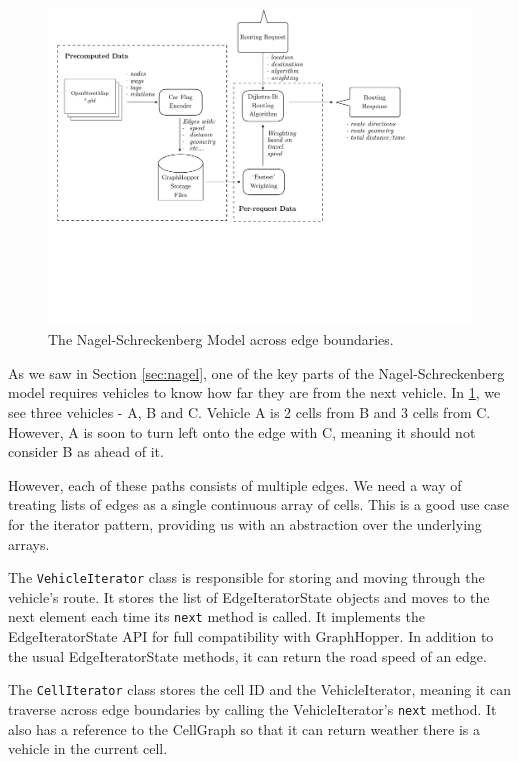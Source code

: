 \documentclass[ %
                    author={Alexander Hill},
                supervisor={Dr. Benjamin Sach},
                    degree={MEng},
                     title={MARMOSET},
                  subtitle={Multi-Agent Route Management using Online Simulation for Efficient Transportation},
                      type={research},
                      year={2016} ]{dissertation}
\begin{document}
\begin{figure}[h]
    \centering
    \includegraphics[scale=0.5,page=5,clip,trim=0 15cm 15cm 0]{architecture}
    \caption{The Nagel-Schreckenberg Model across edge boundaries.}\label{fig:nagel-multi}
\end{figure}

As we saw in Section \ref{sec:nagel}, one of the key parts of the
Nagel-Schreckenberg model requires vehicles to know how far they are from the
next vehicle. In \ref{fig:nagel-multi}, we see three vehicles - A, B and C.
Vehicle A is 2 cells from B and 3 cells from C. However, A is soon to turn left
onto the edge with C, meaning it should not consider B as ahead of it.

However, each of these paths consists of multiple edges. We need a way of
treating lists of edges as a single continuous array of cells. This is a good
use case for the iterator pattern, providing us with an abstraction over the
underlying arrays.

The \texttt{VehicleIterator} class is responsible for storing and moving through
the vehicle's route. It stores the list of EdgeIteratorState objects and moves
to the next element each time its \texttt{next} method is called. It implements
the EdgeIteratorState API for full compatibility with GraphHopper. In addition
to the usual EdgeIteratorState methods, it can return the road speed of an edge.

The \texttt{CellIterator} class stores the cell ID and the VehicleIterator,
meaning it can traverse across edge boundaries by calling the VehicleIterator's
\texttt{next} method. It also has a reference to the CellGraph so that it can
return weather there is a vehicle in the current cell.
\end{document}
